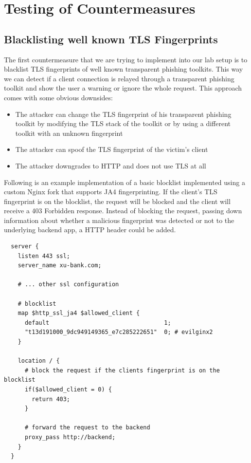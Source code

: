 \documentclass[12pt]{scrbook}
\begin{document}
\newpage \section{Testing of Countermeasures} \subsection{Blacklisting well
known TLS Fingerprints} The first countermeasure that we are trying to implement
into our lab setup is to blacklist TLS fingerprints of well known
transparent phishing toolkits. This way we can detect if a client connection is
relayed through a transparent phishing toolkit and show the user a warning or
ignore the whole request. This approach comes with some obvious downsides:

\begin{itemize}
  \item The attacker can change the TLS fingerprint of his
  transparent phishing toolkit by modifying the TLS stack of the toolkit or by
  using a different toolkit with an unknown fingerprint
  \item The attacker can spoof the TLS fingerprint of the victim's client
  \item The attacker downgrades to HTTP and does not use TLS at all
\end{itemize}

Following is an example implementation of a basic blocklist implemented using a custom Nginx
fork that supports JA4 fingerprinting. If the client's TLS fingerprint is on the blocklist, the request will be blocked and the client will receive a 403 Forbidden response. Instead of blocking the request, passing down information about whether a malicious fingerprint was detected or not to the underlying backend app, a HTTP header could be added.

\begin{verbatim}
  server {
    listen 443 ssl;
    server_name xu-bank.com;

    # ... other ssl configuration

    # blocklist
    map $http_ssl_ja4 $allowed_client {
      default                                 1;
      "t13d191000_9dc949149365_e7c285222651"  0; # evilginx2
    }

    location / {
      # block the request if the clients fingerprint is on the blocklist
      if($allowed_client = 0) {
        return 403;
      }

      # forward the request to the backend
      proxy_pass http://backend;
    }
  }
\end{verbatim}
\end{document}
